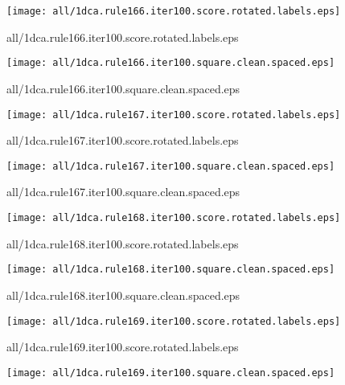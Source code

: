 \documentclass{article}
\begin{document}
\begin{center}
\begin{minipage}{\textwidth}
\texttt{[image: all/1dca.rule166.iter100.score.rotated.labels.eps]}
\end{minipage}
\end{center}
{\footnotesize all/1dca.rule166.iter100.score.rotated.labels.eps}
\begin{center}
\begin{minipage}{\textwidth}
\texttt{[image: all/1dca.rule166.iter100.square.clean.spaced.eps]}
\end{minipage}
\end{center}
{\footnotesize all/1dca.rule166.iter100.square.clean.spaced.eps}
\begin{center}
\begin{minipage}{\textwidth}
\texttt{[image: all/1dca.rule167.iter100.score.rotated.labels.eps]}
\end{minipage}
\end{center}
{\footnotesize all/1dca.rule167.iter100.score.rotated.labels.eps}
\begin{center}
\begin{minipage}{\textwidth}
\texttt{[image: all/1dca.rule167.iter100.square.clean.spaced.eps]}
\end{minipage}
\end{center}
{\footnotesize all/1dca.rule167.iter100.square.clean.spaced.eps}
\begin{center}
\begin{minipage}{\textwidth}
\texttt{[image: all/1dca.rule168.iter100.score.rotated.labels.eps]}
\end{minipage}
\end{center}
{\footnotesize all/1dca.rule168.iter100.score.rotated.labels.eps}
\begin{center}
\begin{minipage}{\textwidth}
\texttt{[image: all/1dca.rule168.iter100.square.clean.spaced.eps]}
\end{minipage}
\end{center}
{\footnotesize all/1dca.rule168.iter100.square.clean.spaced.eps}
\begin{center}
\begin{minipage}{\textwidth}
\texttt{[image: all/1dca.rule169.iter100.score.rotated.labels.eps]}
\end{minipage}
\end{center}
{\footnotesize all/1dca.rule169.iter100.score.rotated.labels.eps}
\begin{center}
\begin{minipage}{\textwidth}
\texttt{[image: all/1dca.rule169.iter100.square.clean.spaced.eps]}
\end{minipage}
\end{center}
\end{document}
